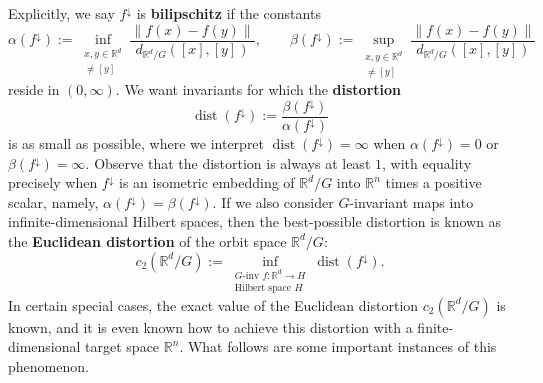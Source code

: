 \documentclass{article}
\theoremstyle{plain}
\theoremstyle{definition}
\begin{document}
Explicitly, we say $f^\downarrow$ is \textbf{bilipschitz} if the constants
\[
\alpha(f^\downarrow)
:=\inf_{\substack{x,y\in\mathbb{R}^d\\ [x]\neq [y]}}\frac{\|f(x)-f(y)\|}{d_{\mathbb{R}^d/G}([x],[y])},
\qquad
\beta(f^\downarrow)
:=\sup_{\substack{x,y\in\mathbb{R}^d\\ [x]\neq [y]}}\frac{\|f(x)-f(y)\|}{d_{\mathbb{R}^d/G}([x],[y])}
\]
reside in $(0,\infty)$.
We want invariants for which the \textbf{distortion}
\[
\operatorname{dist}(f^\downarrow)
:=\frac{\beta(f^{\downarrow})}{\alpha(f^\downarrow)}
\]
is as small as possible, where we interpret $\operatorname{dist}(f^\downarrow)=\infty$ when $\alpha(f^\downarrow)=0$ or $\beta(f^\downarrow)=\infty$.
Observe that the distortion is always at least $1$, with equality precisely when $f^\downarrow$ is an isometric embedding of $\mathbb{R}^d/G$ into $\mathbb{R}^n$ times a positive scalar, namely, $\alpha(f^\downarrow)=\beta(f^\downarrow)$.
If we also consider $G$-invariant maps into infinite-dimensional Hilbert spaces, then the best-possible distortion is known as the \textbf{Euclidean distortion} of the orbit space $\mathbb{R}^d/G$:
\[
c_2(\mathbb{R}^d/G)
:=\inf_{\substack{\text{$G$-inv }f\colon\mathbb{R}^d\to H\\\text{Hilbert space $H$}}}\operatorname{dist}(f^\downarrow).
\]
In certain special cases, the exact value of the Euclidean distortion $c_2(\mathbb{R}^d/G)$ is known, and it is even known how to achieve this distortion with a finite-dimensional target space $\mathbb{R}^n$.
What follows are some important instances of this phenomenon.
\end{document}
